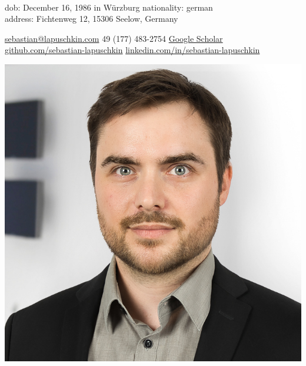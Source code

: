 \documentclass[10pt,a4paper]{article} %
\begin{document}

\noindent
\begin{minipage}{.8\textwidth}

\\
dob: December 16, 1986 in Würzburg  %
\bull
nationality: german \\
address: Fichtenweg 12, 15306 Seelow, Germany %

\noindent\href{mailto:sebastian@lapuschkin.com}{sebastian@lapuschkin.com}\bull %
\textsmaller{+}49 (177) 483-2754\bull %
\href{https://scholar.google.com/citations?user=wpLQuroAAAAJ}{Google Scholar}
\\
\href{https://github.com/sebastian-lapuschkin}{github.com/sebastian-lapuschkin}\bull %
\href{https://www.linkedin.com/in/sebastian-lapuschkin}{linkedin.com/in/sebastian-lapuschkin} %
\end{minipage}
\begin{minipage}{.2\textwidth}
\includegraphics[width=\textwidth]{resources/mug-2021.jpg}
\end{minipage}
\end{document}
